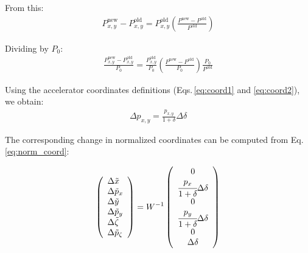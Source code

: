 From this:
\begin{align}
P_{x,y}^\text{new} - P_{x,y}^\text{old} = P_{x,y}^\text{old}  \left(\frac{P^\text{new} - P^\text{old}}{P^\text{old}} \right)
\end{align}

Dividing by $P_0$:
\begin{align}
\frac{P_{x,y}^\text{new} - P_{x,y}^\text{old}}{P_0} =
\frac{P_{x,y}^\text{old}}{P_0}
\left(\frac{P^\text{new} - P^\text{old}}{P_0} \right)
\frac{P_0}{P^\text{old}}
\end{align}

Using the accelerator coordinates definitions (Eqs.\,\ref{eq:coord1} and \ref{eq:coord2}), we obtain:
\begin{align}
\Delta p_{x,y} = \frac{p_{x,y}}{1 + \delta} \Delta \delta
\end{align}

The corresponding change in normalized coordinates can be computed from Eq.\,\ref{eq:norm_coord}:

\begin{equation}
\left(\begin{array}{l}
\Delta \tilde{x} \\
\Delta \tilde{p}_x\\
\Delta \tilde{y} \\
\Delta \tilde{p}_y \\
\Delta \tilde{\zeta} \\
\Delta \tilde{p}_\zeta
\end{array}\right)
=
W^{-1}
\left(\begin{array}{c}
0 \\
\cfrac{p_{x}}{1 + \delta} \Delta \delta \\
0 \\
\cfrac{p_{y}}{1 + \delta} \Delta \delta \\
0 \\
\Delta \delta
\end{array}\right)
\end{equation}

